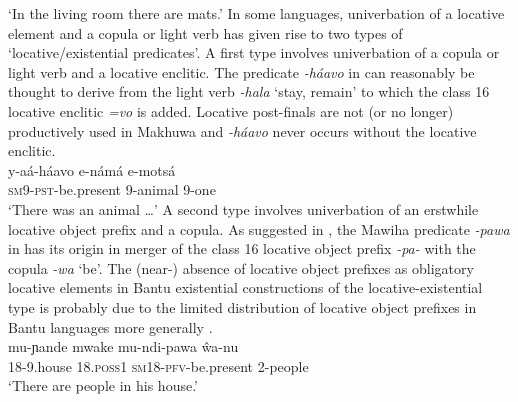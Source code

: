 \documentclass[output=paper]{langscibook}
\begin{document}
\glt `In the living room there are mats.'
\z
In some languages, univerbation of a locative element and a copula or light
verb has given rise to two types of `locative/existential predicates'. A first type involves univerbation of a copula or light verb and a locative enclitic. The  predicate \textit{-h{\'a}avo} in  can reasonably be thought to derive from the light verb \textit{-hala} `stay, remain' to which the class 16 locative enclitic \textit{=vo} is added. Locative post-finals are not (or no longer) productively used in Makhuwa and \textit{-h{\'a}avo} never occurs without the locative enclitic.
\ea\label{ex:makhuwa-animal}
\\
\gll y-a{\'a}-h{\'a}avo e-n{\'a}m{\'a} e-mots{\'a}\\
	\textsc{sm9-pst}-be.present 9-animal 9-one\\
\glt `There was an animal \ldots{}'
\z
A second type involves univerbation of an erstwhile locative object prefix and a copula. As suggested in \citet{BernanderDevos2018}, the Mawiha predicate \textit{-pawa} in  has its origin in merger of the class 16 locative object prefix \textit{-pa-} with the copula \textit{-wa} `be'. The (near-) absence of locative object prefixes as obligatory locative elements in Bantu existential constructions of the locative-existential type is probably due to the limited distribution of locative object prefixes in Bantu languages more generally \citep{Marlo2015,ZellerXXXX}.
\ea\label{ex:mawiha-house}
\\
\gll mu-ɲande mwake mu-ndi-pawa {\^w}a-nu\\
	18-9.house 18.\textsc{poss}1 \textsc{sm}18-\textsc{pfv}-be.present 2-people\\
\glt `There are people in his house.'
\z
\end{document}
